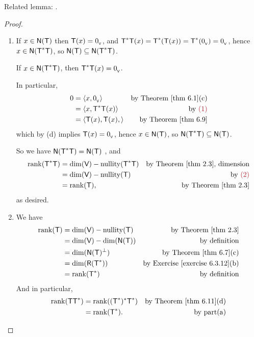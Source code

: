 \begin{note}
Related lemma: .
\end{note}

\begin{proof} \ 

\begin{enumerate}
\item If \(x \in \textsf{N}(\textsf{T})\) then \(\textsf{T}(x) = 0_{_{\textsf{V}}}\), and \(\textsf{T}^*\textsf{T}(x) = \textsf{T}^*(\textsf{T}(x)) = \textsf{T}^*(0_{_{\textsf{V}}}) = 0_{_{\textsf{V}}}\), hence \(x \in \textsf{N}(\textsf{T}^*\textsf{T})\), so \(\textsf{N}(\textsf{T}) \subseteq \textsf{N}(\textsf{T}^*\textsf{T})\).

If \(x \in \textsf{N}(\textsf{T}^*\textsf{T})\), then \(\textsf{T}^*\textsf{T}(x) = 0_{_{\textsf{V}}}\). 

In particular,
\begin{align*}
    0 & = \LG x, \OV \RG & \text{by \THM{6.1}(c)} \\
      & = \LG x, \T^*\T(x) \RG & \text{by \MAROON{(1)}} \\
      & = \LG \T(x), \T(x), \RG & \text{by \THM{6.9}}
\end{align*}
which by (d) implies \(\textsf{T}(x) = 0_{_{\textsf{V}}}\), hence \(x \in \textsf{N}(\textsf{T})\), so \(\textsf{N}(\textsf{T}^*\textsf{T}) \subseteq \textsf{N}(\textsf{T})\).

So we have \(\textsf{N}(\textsf{T}^*\textsf{T}) = \textsf{N}(\textsf{T})\) , and
\begin{align*}
    \rank(\T^*\T) & = \dim(\V) - \nullity(\T^*\T) & \text{by \THM{2.3}, dimension} \\
        & = \dim(\V) - \nullityT & \text{by \MAROON{(2)}} \\
        & = \rankT, & \text{by \THM{2.3}}
\end{align*}
as desired.

\item We have
\begin{align*}
    \rankT & = \dim(\V) - \nullityT & \text{by \THM{2.3}} \\
        & = \dim(\V) - \dim(\NULLT) & \text{by definition} \\
        & = \dim(\NULLT^{\perp}) & \text{by \THM{6.7}(c)} \\
        & = \dim(\RANGE(\T^*)) & \text{by \EXEC{6.3.12}(b)} \\
        & = \rank(\T^*) & \text{by definition}
\end{align*}
And in particular,
\begin{align*}
    \rank(\T \T^*) & = \rank((\T^*)^* \T^*) & \text{by \THM{6.11}(d)} \\
        & = \rank(\T^*). & \text{by part(a)}
\end{align*}


\end{enumerate}
\end{proof}
